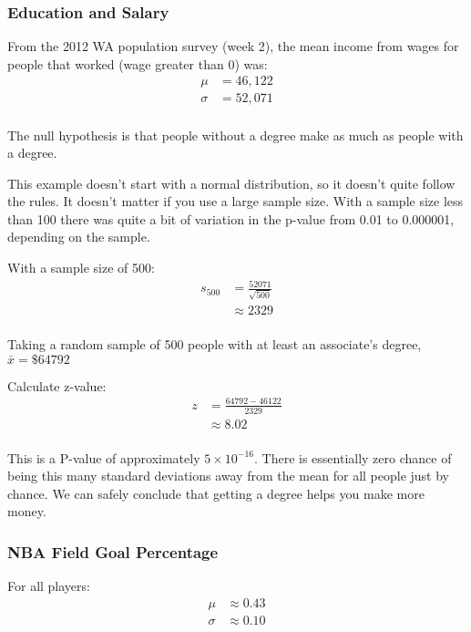 \documentclass[letterpaper, landscape]{exam}
\begin{document}
  \subsubsection{Education and Salary}

  From the 2012 WA population survey (week 2), the mean income from wages for
  people that worked (wage greater than 0) was:
  \begin{align*}
    \mu    & = 46,122 \\
    \sigma & = 52,071 \\
  \end{align*}

  The null hypothesis is that people without a degree make as much as people
  with a degree.

  This example doesn't start with a normal distribution, so it doesn't quite
  follow the rules. It doesn't matter if you use a large sample size. With a
  sample size less than 100 there was quite a bit of variation in the p-value
  from 0.01 to 0.000001, depending on the sample.

  With a sample size of 500:
  \begin{align*}
    s_{500} & = \frac{\num{ 52 071 }}{\sqrt{500}} \\
            & \approx \num{ 2 329 } \\
  \end{align*}

  Taking a random sample of 500 people with at least an associate's degree, 
  $\bar{x} = \$\num{64 792}$

  Calculate z-value:
  \begin{align*}
    z & = \frac{\num{ 64 792 } - \num{ 46 122 }}{2329} \\
      & \approx 8.02 \\
  \end{align*}

  This is a P-value of approximately $5 \times 10^{-16}$. There is essentially
  zero chance of being this many standard deviations away from the mean for all
  people just by chance. We can safely conclude that getting a degree helps you
  make more money.

  \subsubsection{NBA Field Goal Percentage}

  For all players:
  \begin{align*}
    \mu    & \approx 0.43 \\
    \sigma & \approx 0.10 \\
  \end{align*}
\end{document}
